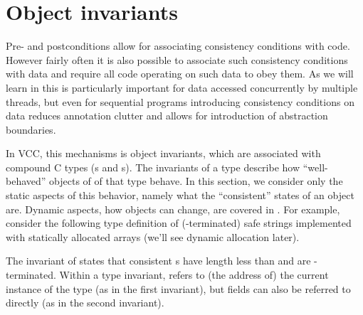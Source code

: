 \section{Object invariants}
\label{sect:invariants}


Pre- and postconditions allow for associating consistency conditions
with code.
However fairly often it is also possible to associate such consistency
conditions with data and require all code operating on such data
to obey them.
As we will learn in  this is particularly important for
data accessed concurrently by multiple threads,
but even for sequential programs introducing consistency conditions
on data reduces annotation clutter and allows for introduction of abstraction
boundaries.


In VCC, this mechanisms is object invariants, which are associated
with compound C types (s and s). The invariants
of a type describe how ``well-behaved'' objects of of that type
behave. In this section, we consider only the static aspects of this
behavior, namely what the ``consistent'' states of an object are. 
Dynamic aspects, \ie how objects can change, are covered in .
For example, consider the following type definition of (-terminated)
safe strings implemented with statically allocated arrays (we'll see
dynamic allocation later).


\noindent
The invariant of  states that consistent
s have length less than  and are
-terminated.  Within a type invariant, \vcc{\this} refers to
(the address of) the current instance of the type (as in the first
invariant), but fields can also be referred to directly (as in the
second invariant). 

